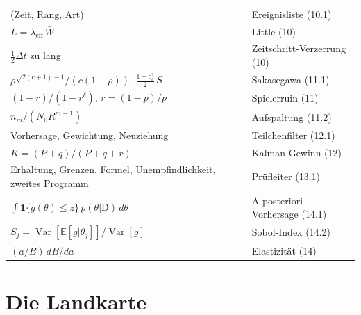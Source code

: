 \begin{merksatz}
\begin{center}
{\small
\renewcommand{\arraystretch}{1.6}
\begin{tabular}{@{}P{4.6cm}P{4.0cm}@{}}
\toprule
(Zeit, Rang, Art) & Ereignisliste (10.1)\\
$L = \lambda_{\text{eff}}\,\bar W$ & Little (10)\\
$\tfrac12\Delta t$ zu lang & Zeitschritt-Verzerrung (10)\\
$\rho^{\sqrt{2(c+1)}-1}/(c(1-\rho))\cdot\tfrac{1+c_s^2}{2}\,S$ & Sakasegawa (11.1)\\
$(1-r)/(1-r^{\ell})$, $r = (1-p)/p$ & Spielerruin (11)\\
$n_m/(N_0R^{m-1})$ & Aufspaltung (11.2)\\
Vorhersage, Gewichtung, Neuziehung & Teilchenfilter (12.1)\\
$K = (P+q)/(P+q+r)$ & Kalman-Gewinn (12)\\
Erhaltung, Grenzen, Formel, Unempfindlichkeit, zweites Programm & Prüfleiter (13.1)\\
$\int\mathbf 1\{g(\theta)\le z\}\,p(\theta|\text{D})\,d\theta$ & A-posteriori-Vorhersage (14.1)\\
$S_j = \operatorname{Var}[\mathbb E[g|\theta_j]]/\operatorname{Var}[g]$ & Sobol-Index (14.2)\\
$(a/B)\,dB/da$ & Elastizität (14)\\
\bottomrule
\end{tabular}}
\end{center}
\end{merksatz}

\section{Die Landkarte}

